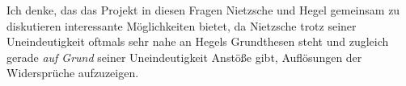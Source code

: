 \documentclass[12pt, a4paper, openany]{report}
\begin{document}
Ich denke, das das Projekt in diesen Fragen Nietzsche und Hegel gemeinsam zu diskutieren interessante Möglichkeiten bietet, da Nietzsche trotz seiner Uneindeutigkeit oftmals sehr nahe an Hegels Grundthesen steht und zugleich gerade \emph{auf Grund} seiner Uneindeutigkeit Anstöße gibt, Auflösungen der Widersprüche aufzuzeigen.

\backmatter
\printbibliography
 
\end{document}
